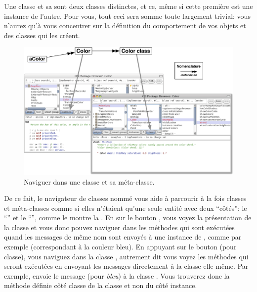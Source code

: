 \documentclass[a4paper,10pt,twoside]{book}
\begin{document}
Une classe et sa  sont deux classes distinctes, et ce, même si cette première est une instance de l'autre. Pour vous, tout ceci sera somme toute largement trivial: vous n'aurez qu'à vous concentrer sur la définition du comportement de vos objets et des classes qui les créent.

\begin{figure}[htb]
\begin{center}
\includegraphics[width=\textwidth]{Color-Buttons}
\caption{Naviguer dans une classe et sa méta-classe.
}
\end{center}
\end{figure}

De ce fait, le navigateur de classes nommé  vous
aide à parcourir à la fois classes et méta-classes comme si elles
n'étaient qu'une seule entité avec deux ``côtés'': le ``'' et le ``'', comme le montre la . 
En \clickant{} sur le bouton , vous voyez la présentation de la classe  et vous donc pouvez naviguer dans les méthodes qui sont exécutées quand les messages de même nom sont envoyés à une instance de , comme par exemple  (correspondant à la couleur bleu). En appuyant
sur le bouton  (pour classe), vous naviguez dans la classe , autrement dit vous voyez les méthodes qui seront exécutées en envoyant les messages directement à la classe  elle-même.
Par exemple,  envoie le message  (pour \emph{bleu}) à la classe .
Vous trouverez donc la méthode  définie côté classe de la classe  et non du côté instance.
\end{document}
